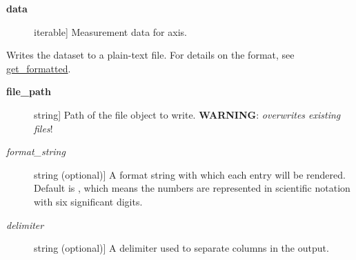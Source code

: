 \documentclass[a4paper,10pt,english]{sphinxmanual}
\begin{document}
\begin{fulllineitems}
\begin{fulllineitems}
\begin{description}
\item[{\textbf{data}}] \leavevmode{[}iterable{]}
Measurement data for axis.

\end{description}

\end{fulllineitems}


\begin{fulllineitems}
\label{index:kafe.dataset.Dataset.write_formatted}
Writes the dataset to a plain-text file. For details on the format, see
{\hyperref[index:get-formatted]{get\_formatted}}.
\begin{description}
\item[{\textbf{file\_path}}] \leavevmode{[}string{]}
Path of the file object to write. \textbf{WARNING}: \emph{overwrites existing
files}!

\item[{\emph{format\_string}}] \leavevmode{[}string (optional){]}
A format string with which each entry will be rendered. Default is
, which means the numbers are represented in scientific
notation with six significant digits.

\item[{\emph{delimiter}}] \leavevmode{[}string (optional){]}
A delimiter used to separate columns in the output.

\end{description}

\end{fulllineitems}


\end{fulllineitems}

\end{document}

